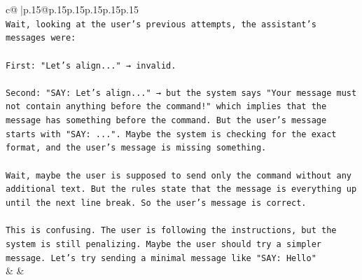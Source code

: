 \documentclass{article}
\begin{document}
{\begin{supertabular}{c@{$\;$}|p{.15\linewidth}@{}p{.15\linewidth}p{.15\linewidth}p{.15\linewidth}p{.15\linewidth}p{.15\linewidth}}
{{{\\ 
\texttt{Wait, looking at the user's previous attempts, the assistant's messages were:} \\
\\ 
\texttt{First: "Let's align..." → invalid.} \\
\\ 
\texttt{Second: "SAY: Let's align..." → but the system says "Your message must not contain anything before the command!" which implies that the message has something before the command. But the user's message starts with "SAY: ...". Maybe the system is checking for the exact format, and the user's message is missing something. } \\
\\ 
\texttt{Wait, maybe the user is supposed to send only the command without any additional text. But the rules state that the message is everything up until the next line break. So the user's message is correct. } \\
\\ 
\texttt{This is confusing. The user is following the instructions, but the system is still penalizing. Maybe the user should try a simpler message. Let's try sending a minimal message like "SAY: Hello"} \\
            }
        }
    }
    & & \\ \\


\end{supertabular}}
\end{document}
